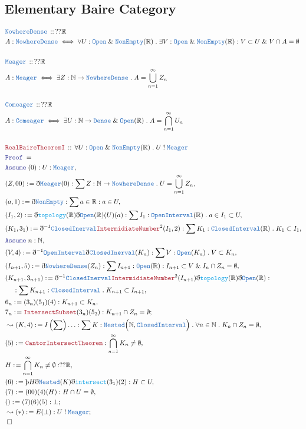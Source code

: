 \documentclass[12pt]{scrartcl}
\newcommand{\TYPE}[1]{\textcolor{NavyBlue}{\mathtt{#1}}}
\newcommand{\FUNC}[1]{\textcolor{Cerulean}{\mathtt{#1}}}
\newcommand{\LOGIC}[1]{\textcolor{Blue}{\mathtt{#1}}}
\newcommand{\THM}[1]{\textcolor{Maroon}{\mathtt{#1}}}
\renewcommand{\.}{\; . \;}
\newcommand{\de}{: \kern 0.1pc =}
\newcommand{\IsNot}{\; ! \;}
\newcommand{\Theorem}[2]{& \THM{#1} \, :: \, #2 \\ & \Proof = \\ }
\newcommand{\DeclareType}[2]{& \TYPE{#1} \, :: \, #2 \\}
\newcommand{\DefineType}[3]{& #1 : \TYPE{#2} \iff #3 \\}
\newcommand{\NewLine}{\\ & \kern 1pc}
\newcommand{\Page}[1]{ \begin{align*} #1 \end{align*}   }
\newcommand{ \bd }{ \ByDef }
\renewcommand{\And}{\; \& \;}
\newcommand{\Reals}{\mathbb{R} }
\newcommand{\Nat}{\mathbb{N} }
\newcommand{\Say}[3]{& #1 \de #2 : #3, \\}
\newcommand{\Conclude}[3]{& #1 \de #2 : #3; \\}
\newcommand{\Derive}[3]{& \leadsto #1 \de #2 : #3, \\}
\newcommand{\DeriveConclude}[3]{& \leadsto #1 \de #2 : #3 ; \\}
\newcommand{\Assume}[2]{& \LOGIC{Assume} \;#1 : #2, \\}
\newcommand{\QED}{\; \square}
\newcommand{\EndProof}{& \QED \\}
\newcommand{\ByDef}{\eth}
\newcommand{\ByConstr}{\text{\thorn}}
\newcommand{\Proof}{\LOGIC{Proof} \; }
\newcommand{\ND}{\TYPE{NowhereDense}}
\begin{document}
\subsection{Elementary Baire Category}
\Page{
	\DeclareType{NowhereDense}{??\Reals}
	\DefineType{A}{NowhereDense}{\forall U : \TYPE{Open} \And \TYPE{NonEmpty}(\Reals) \. 
		\exists V : \TYPE{Open} \And \TYPE{NonEmpty}(\Reals) : V \subset U \And V \cap A = \emptyset}
	\\
	\DeclareType{Meager}{??\Reals}
	\DefineType{A}{Meager}{\exists Z : \Nat \to \ND \. A = \bigcup^\infty_{n=1} Z_n}
	\\
	\DeclareType{Comeager}{??\Reals}
	\DefineType{A}{Comeager}{\exists U : \Nat \to \TYPE{Dense} \And \TYPE{Open}(\Reals) \. A = \bigcap^\infty_{n=1} U_n}
	\\
	\Theorem{RealBaireTheoremI}{\forall U : \TYPE{Open} \And \TYPE{NonEmpty}(\Reals) \. U \IsNot \TYPE{Meager}}
	\Assume{(0)}{U : \TYPE{Meager}}
	\Say{(Z,00)}{\bd \TYPE{Meager}(0)}{\sum Z : \Nat \to \ND \. U = \bigcup^\infty_{n=1} Z_n}
	\Say{(a,1)}{\bd \TYPE{NonEmpty} }{\sum a \in \Reals : a \in U }
	\Say{ (I_1,2) }{ \bd \FUNC{topology}(\Reals)\bd \TYPE{Open}(\Reals)(U)(a)  }
	{ \sum I_1 : \TYPE{OpenInterval}(\Reals) \. a \in I_1 \subset U  }
	\Say{ (K_1,3_1)}{ \bd^{-1} \TYPE{ClosedInerval} \THM{IntermidiateNumber}^2(I_1,2)  }
	{ \sum K_1 : \TYPE{ClosedInterval}(\Reals) \.   K_1 \subset I_1  }
	\Assume{n}{\Nat}
	\Say{(V,4)}{\bd^{-1} \TYPE{OpenInterval} \bd \TYPE{ClosedInerval}(K_n)}{
		\sum V : \TYPE{Open}(K_n) \.  V \subset K_n }
	\Say{(I_{n+1},5)}{\bd \ND (Z_n)}{ \sum I_{n + 1} : \TYPE{Open}(\Reals) : 
		I_{n + 1} \subset V  \And I_n \cap Z_n = \emptyset   }
	\Say{(K_{n + 1},3_{n + 1})}
	{  \bd^{-1} \TYPE{ClosedInerval} \THM{IntermidiateNumber}^2(I_{n + 1})\bd \FUNC{topology}(\Reals)  
		\bd \TYPE{Open}(\Reals) }
	{ \NewLine : \sum K_{n + 1} : \TYPE{ClosedInterval} \. K_{n + 1} \subset I_{n + 1}  }
	\Say{6_n}{  (3_n)(5_1)(4) }{K_{n + 1} \subset K_n }
	\Conclude{7_n}{\THM{IntersectSubset}(3_n)(5_2)}{ K_{n + 1} \cap Z_n = \emptyset}
	\Derive{(K,4)}{I\left(\sum\right)\ldots}
	{
	   \sum K : \TYPE{Nested}\Big(\Nat,\TYPE{ClosedInterval}\Big) \.
	   \forall n \in \Nat \. K_n \cap Z_n = \emptyset
	}
	\Say{(5)}{\THM{CantorIntersectTheorem}}{\bigcap^\infty_{n=1} K_n \neq \emptyset}
	\Say{H}{ \bigcap^\infty_{n=1} K_n \neq \emptyset }{??\Reals}
	\Say{(6) }{\ByConstr H \bd \TYPE{Nested}(K) \bd \FUNC{intersect}(3_1)(2) }{ H \subset U }
	\Say{(7)}{ (00)(4)(H)}{H \cap U = \emptyset}
	\Conclude{()}{(7)(6)(5)}{\bot }
	\DeriveConclude{(*)}{E(\bot)}{ U \IsNot \TYPE{Meager}  }
	\EndProof
}
\end{document}
